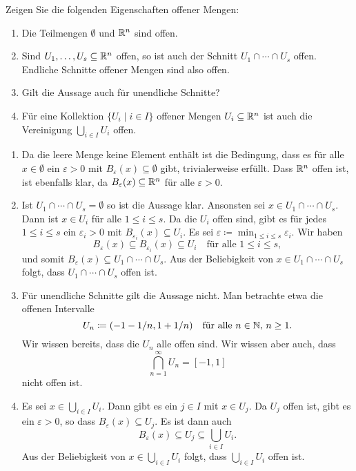 \documentclass[a4paper,10pt]{article}
\begin{document}
\begin{question}
 Zeigen Sie die folgenden Eigenschaften offener Mengen:
 \begin{enumerate}
  \item
   Die Teilmengen $\emptyset$ und $\mathbb{R}^n$ sind offen.
  \item
   Sind $U_1, \dotsc, U_s \subseteq \mathbb{R}^n$ offen, so ist auch der Schnitt $U_1 \cap \dotsb \cap U_s$ offen. Endliche Schnitte offener Mengen sind also offen.
  \item
   Gilt die Aussage auch für unendliche Schnitte?
  \item
   Für eine Kollektion $\{U_i \mid i \in I\}$ offener Mengen $U_i \subseteq \mathbb{R}^n$ ist auch die Vereinigung $\bigcup_{i \in I} U_i$ offen.
 \end{enumerate}
\end{question}
\begin{solution}
 \begin{enumerate}
  \item
   Da die leere Menge keine Element enthält ist die Bedingung, dass es für alle $x \in \emptyset$ ein $\varepsilon > 0$ mit $B_\varepsilon(x) \subseteq \emptyset$ gibt, trivialerweise erfüllt. Dass $\mathbb{R}^n$ offen ist, ist ebenfalls klar, da $B_\varepsilon(x) \subseteq \mathbb{R}^n$ für alle $\varepsilon > 0$.
  \item
   Ist $U_1 \cap \dotsb \cap U_s = \emptyset$ so ist die Aussage klar. Ansonsten sei $x \in U_1 \cap \dotsb \cap U_s$. Dann ist $x \in U_i$ für alle $1 \leq i \leq s$. Da die $U_i$ offen sind, gibt es für jedes $1 \leq i \leq s$ ein $\varepsilon_i > 0$ mit $B_{\varepsilon_i}(x) \subseteq U_i$. Es sei $\varepsilon \coloneqq \min_{1 \leq i \leq s} \varepsilon_i$. Wir haben
   \[
    B_\varepsilon(x) \subseteq B_{\varepsilon_i}(x) \subseteq U_i
    \quad
    \text{für alle $1 \leq i \leq s$},
   \]
   und somit $B_\varepsilon(x) \subseteq U_1 \cap \dotsb \cap U_s$. Aus der Beliebigkeit von $x \in U_1 \cap \dotsb \cap U_s$ folgt, dass $U_1 \cap \dotsb \cap U_s$ offen ist.
  \item
   Für unendliche Schnitte gilt die Aussage nicht. Man betrachte etwa die offenen Intervalle
   \[
    U_n \coloneqq (-1-1/n, 1+1/n)  \quad \text{für alle $n \in \mathbb{N}$, $n \geq 1$}.
   \]
   Wir wissen bereits, dass die $U_n$ alle offen sind. Wir wissen aber auch, dass
   \[
    \bigcap_{n=1}^\infty U_n = [-1,1]
   \]
   nicht offen ist.
  \item
   Es sei $x \in \bigcup_{i \in I} U_i$. Dann gibt es ein $j \in I$ mit $x \in U_j$. Da $U_j$ offen ist, gibt es ein $\varepsilon > 0$, so dass $B_\varepsilon(x) \subseteq U_j$. Es ist dann auch
   \[
    B_\varepsilon(x) \subseteq U_j \subseteq \bigcup_{i \in I} U_i.
   \]
   Aus der Beliebigkeit von $x \in \bigcup_{i \in I} U_i$ folgt, dass $\bigcup_{i \in I} U_i$ offen ist.
 \end{enumerate}
\end{solution}
\end{document}
